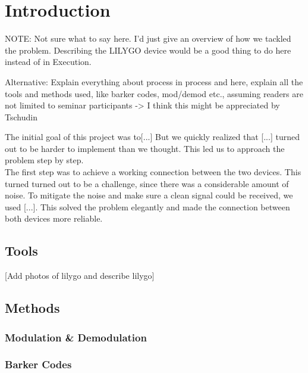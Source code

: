 \chapter{Introduction}
{NOTE: Not sure what to say here. I'd just give an overview of how we tackled the problem.
Describing the LILYGO device would be a good thing to do here instead of in Execution.

Alternative:
Explain everything about process in process and here, explain all the tools and methods used, like barker codes, mod/demod etc., assuming readers are not limited to seminar participants -> I think this might be appreciated by Tschudin}





The initial goal of this project was to[...] But we quickly realized that [...] turned out to be harder to implement than we thought. This led us to approach the problem step by step. \\

The first step was to achieve a working connection between the two devices. This turned turned out to be a challenge, since there was a considerable amount of noise. To mitigate the noise and make sure a clean signal could be received, we used [...]. This solved the problem elegantly and made the connection between both devices more reliable.

\section{Tools}
[Add photos of lilygo and describe lilygo]

\section{Methods}
\subsection{Modulation & Demodulation}
\subsection{Barker Codes}
